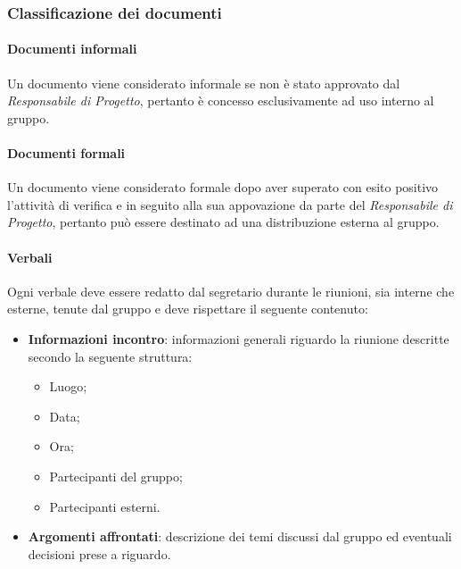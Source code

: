 \subsubsection{Classificazione dei documenti}
\paragraph{Documenti informali} \Spazio
Un documento viene considerato informale se non è stato approvato dal \emph{Responsabile di Progetto}, pertanto è concesso esclusivamente ad uso interno al gruppo.

\paragraph{Documenti formali} \Spazio
Un documento viene considerato formale dopo aver superato con esito positivo l'attività di verifica e in seguito alla sua appovazione da parte del \emph{Responsabile di Progetto}, pertanto può essere destinato ad una distribuzione esterna al gruppo.

\paragraph{Verbali} \Spazio
Ogni verbale deve essere redatto dal segretario durante le riunioni, sia interne che esterne, tenute dal gruppo e deve rispettare il seguente contenuto:
\begin{itemize}
	\item \textbf{Informazioni incontro}: informazioni generali riguardo la riunione descritte secondo la seguente struttura:
	\begin{itemize}
		\item Luogo;
		\item Data;
		\item Ora;
		\item Partecipanti del gruppo;
		\item Partecipanti esterni.
	\end{itemize}
	\item \textbf{Argomenti affrontati}: descrizione dei temi discussi dal gruppo ed eventuali decisioni prese a riguardo.
\end{itemize}



